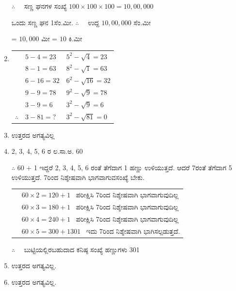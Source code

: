 \begin{enumerate}
\vskip 0.1cm

$\therefore\quad$ ಸಣ್ಣ ಘನಗಳ ಸಂಖ್ಯೆ $100\times 100\times 100 = 10,00,000$

\vskip 0.1cm

ಒಂದು ಸಣ್ಣ ಘನ 1ಸೆಂ.ಮೀ. $\therefore\quad$ ಉದ್ದ $10,00,000$ ಸೆಂ.ಮೀ 

\vskip 0.1cm

= $10,000$ ಮೀ = $10$ ಕಿ.ಮೀ 

\item 
\begin{tabular}[t]{lll}
& $5 - 4 = 23$ & $5^{2} - \sqrt{4} = 23$\\
& $8 - 1 = 63$ & $8^{2} - \sqrt{1} = 63$\\
& $6 - 16 = 32$ & $6^{2} - \sqrt{16} = 32$\\
& $9 - 9 = 78$ & $9^{2} - \sqrt{9} = 78$\\
& $3 - 9 = 6$ & $3^{2} - \sqrt{9} = 6$\\
$\therefore$ & $3 - 81 = ?$ & $3^{2} - \sqrt{81} = 0$
\end{tabular}

\item ಉತ್ತರದ ಅಗತ್ಯವಿಲ್ಲ 

\item 2, 3, 4, 5, 6 ರ ಲ.ಸಾ.ಅ. 60

$\therefore$ 60 $+$ 1 ಇದ್ದರೆ 2, 3, 4, 5, 6 ರಂತೆ ತೆಗೆದಾಗ 1 ಹಣ್ಣು ಉಳಿಯುತ್ತದೆ. ಆದರೆ 7ರಂತೆ ತೆಗೆದಾಗ 5 ಉಳಿಯುತ್ತದೆ. 7ರಿಂದ ನಿಶ್ಶೇಷವಾಗಿ ಭಾಗವಾಗುವ\break ಸಂಖ್ಯೆ ಬೇಕು.

\begin{tabular}{ll}
& $60\times 2 = 120 + 1$  ~ಪರೀಕ್ಷಿಸಿ 7ರಿಂದ ನಿಶ್ಶೇಷವಾಗಿ ಭಾಗವಾಗುವುದಿಲ್ಲ\\
& $60\times 3 = 180 + 1$  ~ಪರೀಕ್ಷಿಸಿ 7ರಿಂದ ನಿಶ್ಶೇಷವಾಗಿ ಭಾಗವಾಗುವುದಿಲ್ಲ\\
& $60\times 4 = 240 + 1$  ~ಪರೀಕ್ಷಿಸಿ 7ರಿಂದ ನಿಶ್ಶೇಷವಾಗಿ ಭಾಗವಾಗುವುದಿಲ್ಲ\\
& $60\times 5 = 300 + 1   301$  ~ಇದು 7ರಿಂದ ನಿಶ್ಶೇಷವಾಗಿ ಭಾಗಿಸಲ್ಪಡುತ್ತದೆ. 
\end{tabular}

$\therefore\quad$ ಬುಟ್ಟಿಯಲ್ಲಿರಬಹುದಾದ ಕನಿಷ್ಠ ಸಂಖ್ಯೆ ಹಣ್ಣುಗಳು 301

\item ಉತ್ತರದ ಅಗತ್ಯವಿಲ್ಲ.

\item ಉತ್ತರದ ಅಗತ್ಯವಿಲ್ಲ.
\end{enumerate}

